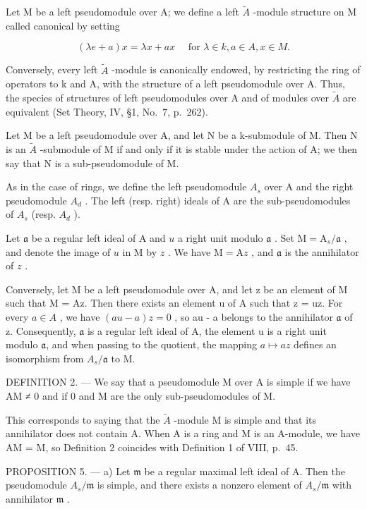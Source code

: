 Let M be a left pseudomodule over A; we define a left \(\tilde{A}\) -module structure on M called canonical by setting

\[
(\lambda e + a) x = \lambda x + a x \quad \text { for } \lambda \in k, a \in A, x \in M.
\]

Conversely, every left \(\widetilde{A}\) -module is canonically endowed, by restricting the ring of operators to k and A, with the structure of a left pseudomodule over A. Thus, the species of structures of left pseudomodules over A and of modules over \(\widetilde{A}\) are equivalent (Set Theory, IV, §1, No.~7, p.~262).

Let M be a left pseudomodule over A, and let N be a k-submodule of M. Then N is an \(\widetilde{A}\) -submodule of M if and only if it is stable under the action of A; we then say that N is a sub-pseudomodule of M.

As in the case of rings, we define the left pseudomodule \(A_{s}\) over A and the right pseudomodule \(A_{d}\) . The left (resp. right) ideals of A are the sub-pseudomodules of \(A_{s}\) (resp. \(A_{d}\) ).

Let \(\mathfrak{a}\) be a regular left ideal of A and \(u\) a right unit modulo \(\mathfrak{a}\) . Set \(\mathrm{M} = \mathrm{A}_s / \mathfrak{a}\) , and denote the image of \(u\) in M by \(z\) . We have \(\mathrm{M} = \mathrm{A}z\) , and \(\mathfrak{a}\) is the annihilator of \(z\) .

Conversely, let M be a left pseudomodule over A, and let z be an element of M such that M = Az. Then there exists an element u of A such that z = uz. For every \(a \in A\) , we have \((au - a)z = 0\) , so au - a belongs to the annihilator \(\mathfrak{a}\) of z. Consequently, \(\mathfrak{a}\) is a regular left ideal of A, the element u is a right unit modulo \(\mathfrak{a}\), and when passing to the quotient, the mapping \(a \mapsto az\) defines an isomorphism from \(A_{s}/\mathfrak{a}\) to M.

DEFINITION 2. --- We say that a pseudomodule M over A is simple if we have AM ≠ 0 and if 0 and M are the only sub-pseudomodules of M.

This corresponds to saying that the \(\tilde{A}\) -module M is simple and that its annihilator does not contain A. When A is a ring and M is an A-module, we have AM = M, so Definition 2 coincides with Definition 1 of VIII, p.~45.

PROPOSITION 5. --- a) Let \(\mathfrak{m}\) be a regular maximal left ideal of A. Then the pseudomodule \(A_s / \mathfrak{m}\) is simple, and there exists a nonzero element of \(A_s / \mathfrak{m}\) with annihilator \(\mathfrak{m}\) .

